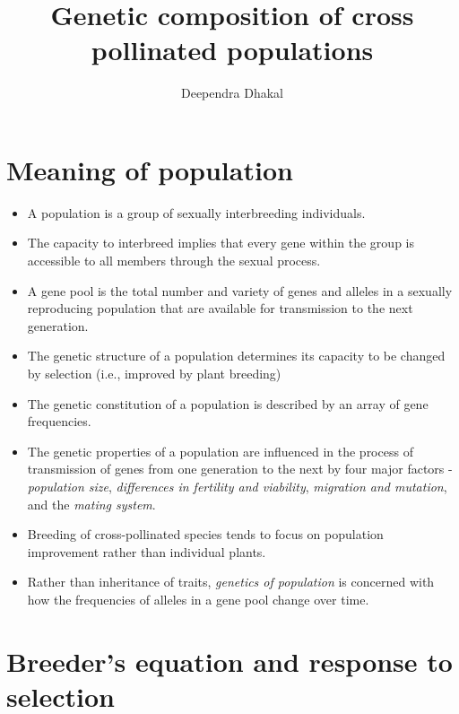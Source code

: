 \documentclass[11pt,ignorenonframetext,aspectratio=169]{beamer}
\title[]{Genetic composition of cross pollinated populations}
\author[
        Deependra Dhakal
    ]{Deependra Dhakal}
\institute[
    ]{
    Agriculture and Forestry University\\
\textit{ddhakal.rookie@gmail.com}\\
\url{https://rookie.rbind.io}
    }
\date[
      
  ]{
    }
\providecommand{\tightlist}{%
  \setlength{\itemsep}{0pt}\setlength{\parskip}{0pt}}
\begin{document}
  \begin{frame}[plain]
  \titlepage
  \end{frame}



\hypertarget{meaning-of-population}{%
\section{Meaning of population}\label{meaning-of-population}}

\begin{frame}{}
\protect\hypertarget{section}{}
\begin{itemize}
\tightlist
\item
  A population is a group of sexually interbreeding individuals.
\item
  The capacity to interbreed implies that every gene within the group is
  accessible to all members through the sexual process.
\item
  A gene pool is the total number and variety of genes and alleles in a
  sexually reproducing population that are available for transmission to
  the next generation.
\item
  The genetic structure of a population determines its capacity to be
  changed by selection (i.e., improved by plant breeding)
\item
  The genetic constitution of a population is described by an array of
  gene frequencies.
\item
  The genetic properties of a population are influenced in the process
  of transmission of genes from one generation to the next by four major
  factors - \emph{population size}, \emph{differences in fertility and
  viability}, \emph{migration and mutation}, and the \emph{mating
  system}.
\item
  Breeding of cross-pollinated species tends to focus on population
  improvement rather than individual plants.
\item
  Rather than inheritance of traits, \emph{genetics of population} is
  concerned with how the frequencies of alleles in a gene pool change
  over time.
\end{itemize}
\end{frame}

\hypertarget{breeders-equation-and-response-to-selection}{%
\section{Breeder's equation and response to
selection}\label{breeders-equation-and-response-to-selection}}
\end{document}
